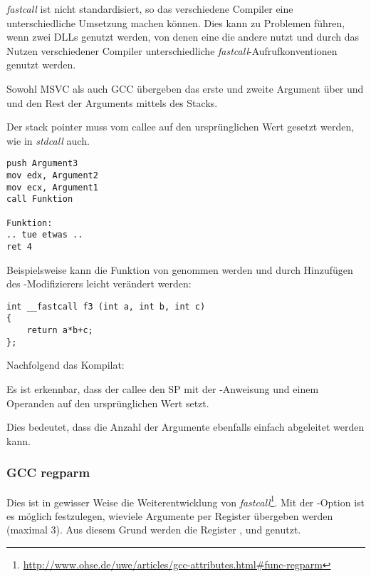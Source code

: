 \emph{fastcall} ist nicht standardisiert, so das verschiedene Compiler eine unterschiedliche
Umsetzung machen können.
Dies kann zu Problemen führen, wenn zwei DLLs genutzt werden, von denen eine die andere nutzt
und durch das Nutzen verschiedener Compiler unterschiedliche \emph{fastcall}-Aufrufkonventionen
genutzt werden.

Sowohl MSVC als auch GCC übergeben das erste und zweite Argument über \ECX und \EDX und den Rest
der Arguments mittels des Stacks.

Der \gls{stack pointer} muss vom \gls{callee} auf den ursprünglichen Wert gesetzt werden,
wie in \emph{stdcall} auch.

\begin{lstlisting}[caption=fastcall]
push Argument3
mov edx, Argument2
mov ecx, Argument1
call Funktion

Funktion:
.. tue etwas ..
ret 4
\end{lstlisting}

Beispielsweise kann die Funktion von  genommen werden und durch
Hinzufügen des -Modifizierers leicht verändert werden:

\begin{lstlisting}
int __fastcall f3 (int a, int b, int c)
{
	return a*b+c;
};
\end{lstlisting}

Nachfolgend das Kompilat:

%


Es ist erkennbar, dass der \gls{callee} den \ac{SP} mit der -Anweisung
und einem Operanden auf den ursprünglichen Wert setzt.

Dies bedeutet, dass die Anzahl der Argumente ebenfalls einfach abgeleitet werden kann.

\subsubsection{GCC regparm}

\newcommand{\URLREGPARMM}{\url{http://www.ohse.de/uwe/articles/gcc-attributes.html\#func-regparm}}

Dies ist in gewisser Weise die Weiterentwicklung von \emph{fastcall}\footnote{\URLREGPARMM}.
Mit der -Option ist es möglich festzulegen, wieviele Argumente per Register
übergeben werden (maximal 3).
Aus diesem Grund werden die Register \EAX, \EDX und \ECX genutzt.

